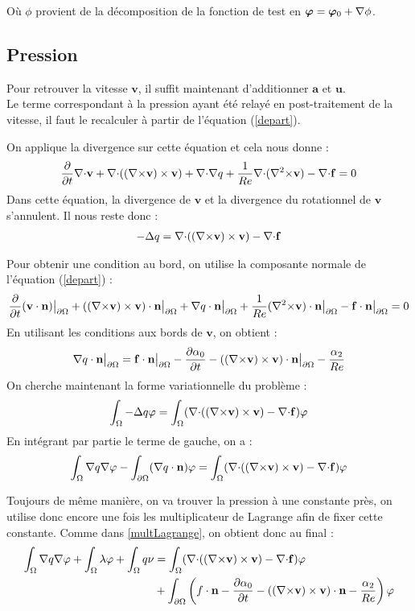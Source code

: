 Où $\phi$ provient de la décomposition de la fonction de test en $\bm{\varphi}=\bm{\varphi}_0+{\nabla}\phi$.

\subsection{Pression}
\label{pression}

Pour retrouver la vitesse $\mathbf{v}$, il suffit maintenant d'additionner $\mathbf{a}$ et $\mathbf{u}$.\\
Le terme correspondant à la pression ayant été relayé en post-traitement de la vitesse, il faut le recalculer à partir de l'équation (\ref{depart}).

On applique la divergence sur cette équation et cela nous donne :
\[
\frac{\partial}{\partial t}{\nabla\cdot} \mathbf{v} + {\nabla\cdot}(({\nabla\times} \mathbf{v})\times \mathbf{v}) + {\nabla\cdot}{\nabla} q + \frac{1}{Re}{\nabla\cdot}({\nabla^2\times} \mathbf{v}) - {\nabla\cdot} \mathbf{f} = 0
\]
Dans cette équation, la divergence de $\mathbf{v}$ et la divergence du rotationnel de $\mathbf{v}$ s'annulent. Il nous reste donc :
\begin{eqnarray}
\label{q}
-{\Delta} q = {\nabla\cdot}(({\nabla\times} \mathbf{v})\times \mathbf{v}) - {\nabla\cdot} \mathbf{f}
\end{eqnarray}

Pour obtenir une condition au bord, on utilise la composante normale de l'équation (\ref{depart}) :
\[
\frac{\partial}{\partial t}(\mathbf{v}\cdot \mathbf{n}){\big\rvert_{\partial\Omega}} + (({\nabla\times} \mathbf{v})\times \mathbf{v})\cdot \mathbf{n}{\big\rvert_{\partial\Omega}} + {\nabla} q\cdot \mathbf{n}{\big\rvert_{\partial\Omega}} +\frac{1}{Re}({\nabla^2\times} \mathbf{v})\cdot \mathbf{n}{\big\rvert_{\partial\Omega}} - \mathbf{f}\cdot \mathbf{n}{\big\rvert_{\partial\Omega}} = 0
\]
En utilisant les conditions aux bords de $\mathbf{v}$, on obtient :
\[
{\nabla} q\cdot \mathbf{n}{\big\rvert_{\partial\Omega}} =  \mathbf{f}\cdot \mathbf{n}{\big\rvert_{\partial\Omega}} - \frac{\partial\alpha_0}{\partial t} - (({\nabla\times} \mathbf{v})\times \mathbf{v})\cdot \mathbf{n}{\big\rvert_{\partial\Omega}} - \frac{\alpha_2}{Re}
\]
On cherche maintenant la forme variationnelle du problème :
\[
\int_\Omega -{\Delta} q\varphi = \int_\Omega ({\nabla\cdot}(({\nabla\times} \mathbf{v})\times \mathbf{v}) -{\nabla\cdot} \mathbf{f})\varphi
\]
En intégrant par partie le terme de gauche, on a :
\[
\int_\Omega {\nabla} q{\nabla}\varphi - \int_{\partial\Omega} ({\nabla} q\cdot \mathbf{n})\varphi = \int_\Omega ({\nabla\cdot}(({\nabla\times} \mathbf{v})\times \mathbf{v}) -{\nabla\cdot} \mathbf{f})\varphi
\]

Toujours de même manière, on va trouver la pression à une constante près, on utilise donc encore une fois les multiplicateur de Lagrange afin de fixer cette constante. Comme dans \ref{multLagrange}, on obtient donc au final :
\begin{equation}
\label{fvq}
\begin{aligned}
\int_\Omega {\nabla} q{\nabla}\varphi + \int_\Omega \lambda\varphi + \int_\Omega q\nu &= \int_\Omega ({\nabla\cdot}(({\nabla\times} \mathbf{v})\times \mathbf{v}) -{\nabla\cdot} \mathbf{f})\varphi\\
&+ \int_{\partial\Omega} \left(f\cdot \mathbf{n} - \frac{\partial\alpha_0}{\partial t} - (({\nabla\times} \mathbf{v})\times \mathbf{v})\cdot \mathbf{n} - \frac{\alpha_2}{Re}\right)\varphi
\end{aligned}
\end{equation}

